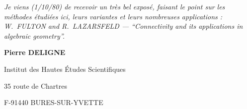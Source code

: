 \documentclass[12pt,a4paper]{article}
\begin{document}
\vspace{1ex}
\textit{Je viens (1/10/80) de recevoir un très bel exposé, faisant le point sur les méthodes étudiées ici, leurs variantes et leurs nombreuses applications : W.\ FULTON and R.\ LAZARSFELD --- ``Connectivity and its applications in algebraic geometry''.}

\vspace{2ex}
\begin{flushright}
\textbf{Pierre DELIGNE}

Institut des Hautes Études Scientifiques

35 route de Chartres

F-91440 BURES-SUR-YVETTE
\end{flushright}
\end{document}
